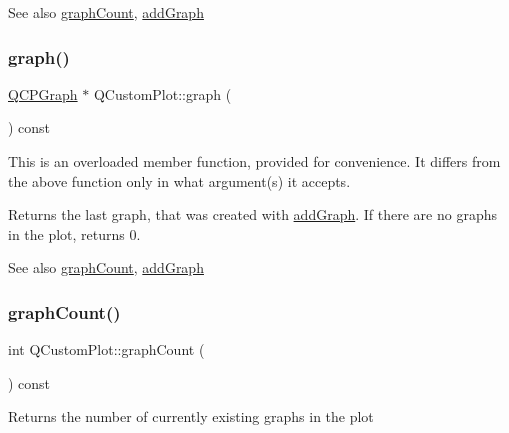 \begin{DoxySeeAlso}{See also}
\mbox{\hyperlink{class_q_custom_plot_a5e1787cdde868c4d3790f9ebc8207d90}{graph\+Count}}, \mbox{\hyperlink{class_q_custom_plot_a6fb2873d35a8a8089842d81a70a54167}{add\+Graph}} 
\end{DoxySeeAlso}
\mbox{\label{class_q_custom_plot_aac190865a67f19af3fdf2136774997af}} 
\subsubsection{\texorpdfstring{graph()}{graph()}\hspace{0.1cm}{\footnotesize\ttfamily [2/2]}}
{\footnotesize\ttfamily \mbox{\hyperlink{class_q_c_p_graph}{Q\+C\+P\+Graph}} $\ast$ Q\+Custom\+Plot\+::graph (\begin{DoxyParamCaption}{ }\end{DoxyParamCaption}) const}

This is an overloaded member function, provided for convenience. It differs from the above function only in what argument(s) it accepts.

Returns the last graph, that was created with \mbox{\hyperlink{class_q_custom_plot_a6fb2873d35a8a8089842d81a70a54167}{add\+Graph}}. If there are no graphs in the plot, returns 0.

\begin{DoxySeeAlso}{See also}
\mbox{\hyperlink{class_q_custom_plot_a5e1787cdde868c4d3790f9ebc8207d90}{graph\+Count}}, \mbox{\hyperlink{class_q_custom_plot_a6fb2873d35a8a8089842d81a70a54167}{add\+Graph}} 
\end{DoxySeeAlso}
\mbox{\label{class_q_custom_plot_a5e1787cdde868c4d3790f9ebc8207d90}} 
\subsubsection{\texorpdfstring{graph\+Count()}{graphCount()}}
{\footnotesize\ttfamily int Q\+Custom\+Plot\+::graph\+Count (\begin{DoxyParamCaption}{ }\end{DoxyParamCaption}) const}

Returns the number of currently existing graphs in the plot

